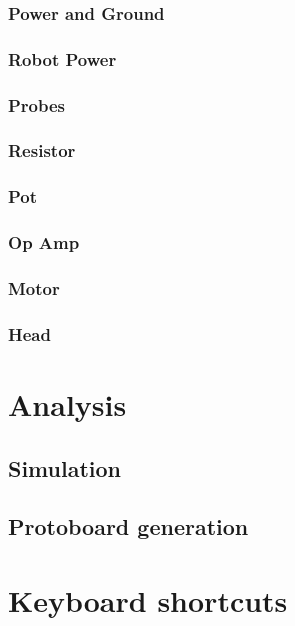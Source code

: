 \documentclass[12pt]{amsart}
\begin{document}
\subsubsection{Power and Ground}

\subsubsection{Robot Power}

\subsubsection{Probes}

\subsubsection{Resistor}

\subsubsection{Pot}

\subsubsection{Op Amp}

\subsubsection{Motor}

\subsubsection{Head}

\section{Analysis}

\subsection{Simulation}

\subsection{Protoboard generation}

\section{Keyboard shortcuts}
\end{document}
